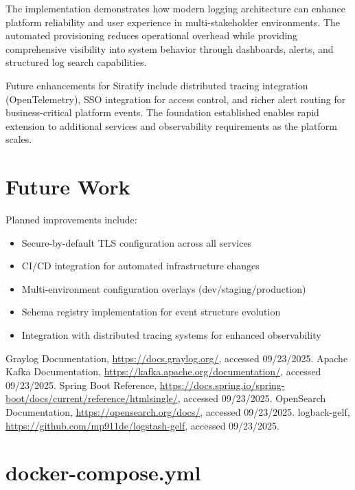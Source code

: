 \documentclass[12pt,a4paper]{report}
\begin{document}
The implementation demonstrates how modern logging architecture can enhance platform reliability and user experience in multi-stakeholder environments. The automated provisioning reduces operational overhead while providing comprehensive visibility into system behavior through dashboards, alerts, and structured log search capabilities.

Future enhancements for Siratify include distributed tracing integration (OpenTelemetry), SSO integration for access control, and richer alert routing for business-critical platform events. The foundation established enables rapid extension to additional services and observability requirements as the platform scales.

\chapter*{Future Work}
Planned improvements include:
\begin{itemize}[leftmargin=1.2cm]
  \item Secure-by-default TLS configuration across all services
  \item CI/CD integration for automated infrastructure changes
  \item Multi-environment configuration overlays (dev/staging/production)
  \item Schema registry implementation for event structure evolution
  \item Integration with distributed tracing systems for enhanced observability
\end{itemize}

\begin{thebibliography}{9}
 Graylog Documentation, \url{https://docs.graylog.org/}, accessed 09/23/2025.
 Apache Kafka Documentation, \url{https://kafka.apache.org/documentation/}, accessed 09/23/2025.
 Spring Boot Reference, \url{https://docs.spring.io/spring-boot/docs/current/reference/htmlsingle/}, accessed 09/23/2025.
 OpenSearch Documentation, \url{https://opensearch.org/docs/}, accessed 09/23/2025.
 logback-gelf, \url{https://github.com/mp911de/logstash-gelf}, accessed 09/23/2025.
\end{thebibliography}

\appendix
\chapter{docker-compose.yml}
\end{document}
